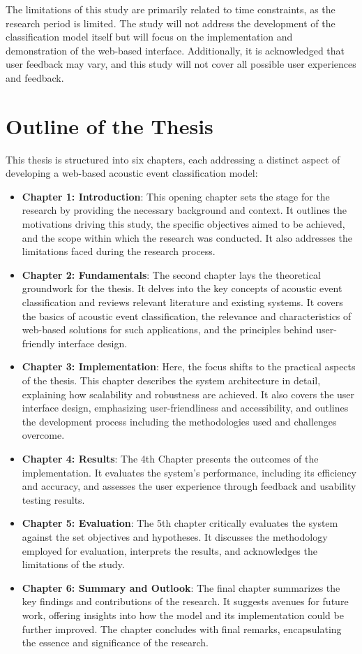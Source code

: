 The limitations of this study are primarily related to time constraints, as the research period is limited. The study will not address the development of the classification model itself but will focus on the implementation and demonstration of the web-based interface. Additionally, it is acknowledged that user feedback may vary, and this study will not cover all possible user experiences and feedback.

\section{Outline of the Thesis}
This thesis is structured into six chapters, each addressing a distinct aspect of developing a web-based acoustic event classification model:

\begin{itemize}
  \item \textbf{Chapter 1: Introduction}: This opening chapter sets the stage for the research by providing the necessary background and context. It outlines the motivations driving this study, the specific objectives aimed to be achieved, and the scope within which the research was conducted. It also addresses the limitations faced during the research process.
  \item \textbf{Chapter 2: Fundamentals}: The second chapter lays the theoretical groundwork for the thesis. It delves into the key concepts of acoustic event classification and reviews relevant literature and existing systems. It covers the basics of acoustic event classification, the relevance and characteristics of web-based solutions for such applications, and the principles behind user-friendly interface design.
  \item \textbf{Chapter 3: Implementation}: Here, the focus shifts to the practical aspects of the thesis. This chapter describes the system architecture in detail, explaining how scalability and robustness are achieved. It also covers the user interface design, emphasizing user-friendliness and accessibility, and outlines the development process including the methodologies used and challenges overcome.
  \item \textbf{Chapter 4: Results}: The 4th Chapter presents the outcomes of the implementation. It evaluates the system’s performance, including its efficiency and accuracy, and assesses the user experience through feedback and usability testing results.
  \item \textbf{Chapter 5: Evaluation}: The 5th chapter critically evaluates the system against the set objectives and hypotheses. It discusses the methodology employed for evaluation, interprets the results, and acknowledges the limitations of the study.
  \item \textbf{Chapter 6: Summary and Outlook}: The final chapter summarizes the key findings and contributions of the research. It suggests avenues for future work, offering insights into how the model and its implementation could be further improved. The chapter concludes with final remarks, encapsulating the essence and significance of the research.


\end{itemize}
